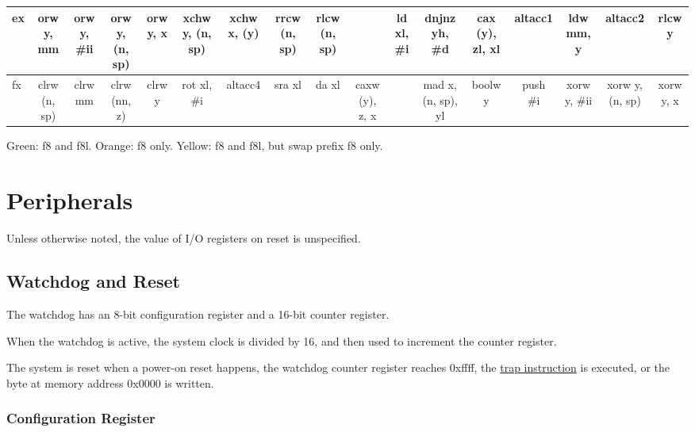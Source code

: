 \documentclass{book}
\begin{document}
\begin{table}
\begin{adjustbox}{width=1.2\textwidth}
\begin{tabular}{l||c|c|c|c|c|c|c|c|c|c|c|c|c|c|c|c}
\hline
ex & \cellcolor{Bisque1} orw y, mm & \cellcolor{Bisque1} orw y, \#ii & \cellcolor{Bisque1} orw y, (n, sp) & \cellcolor{Bisque1} orw y, x & \cellcolor{Bisque1} xchw y, (n, sp) & \cellcolor{DarkSeaGreen1} xchw x, (y) & \cellcolor{Bisque1} rrcw (n, sp) & \cellcolor{Bisque1} rlcw (n, sp) & \cellcolor{white}  & \cellcolor{DarkSeaGreen1} ld xl, \#i & \cellcolor{Bisque1} dnjnz yh, \#d & \cellcolor{DarkSeaGreen1} cax (y), zl, xl & \cellcolor{DarkSeaGreen1} altacc1 & \cellcolor{DarkSeaGreen1} ldw mm, y & \cellcolor{DarkSeaGreen1} altacc2 & \cellcolor{Bisque1} rlcw y \\
\hline
fx & \cellcolor{DarkSeaGreen1} clrw (n, sp) & \cellcolor{DarkSeaGreen1} clrw mm & \cellcolor{DarkSeaGreen1} clrw (nn, z) & \cellcolor{DarkSeaGreen1} clrw y & \cellcolor{Bisque1} rot xl, \#i & \cellcolor{DarkSeaGreen1} altacc4 & \cellcolor{DarkSeaGreen1} sra xl & \cellcolor{DarkSeaGreen1} da xl & \cellcolor{DarkSeaGreen1} caxw (y), z, x & \cellcolor{white}  & \cellcolor{Bisque1} mad x, (n, sp), yl & \cellcolor{Bisque1} boolw y & \cellcolor{DarkSeaGreen1} push \#i & \cellcolor{Bisque1} xorw y, \#ii & \cellcolor{Bisque1} xorw y, (n, sp) & \cellcolor{Bisque1} xorw y, x 
\end{tabular}
\end{adjustbox}
Green: f8 and f8l. Orange: f8 only. Yellow: f8 and f8l, but swap prefix f8 only.
\end{table}

\chapter{Peripherals}

Unless otherwise noted, the value of I/O registers on reset is unspecified.

\section{Watchdog and Reset}\label{periph:watchdog}

The watchdog has an 8-bit configuration register and a 16-bit counter register.

When the watchdog is active, the system clock is divided by 16, and then used to increment the counter register.

The system is reset when a power-on reset happens, the watchdog counter register reaches 0xffff, the \hyperref[inst:trap]{trap instruction} is executed, or the byte at memory address 0x0000 is written.

\subsection*{Configuration Register}
\end{document}
